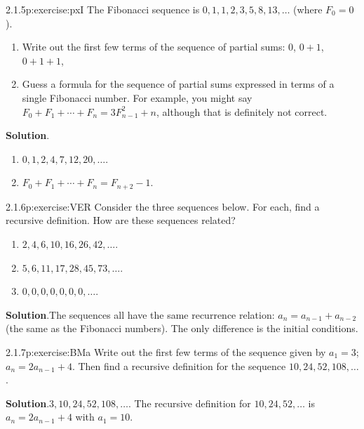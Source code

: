 \documentclass[twoside,11pt,]{book}
\newcommand{\blocktitlefont}{\relax}
\numberwithin{equation}{chapter}
\begin{document}
\begin{divisionsolution}{2.1.5}{}{p:exercise:pxI}%
\label{g:notation:idp140965978208}%
The Fibonacci sequence is \(0, 1, 1, 2, 3, 5, 8, 13, \ldots\) (where \(F_0 = 0\)). %
\begin{enumerate}[label=(\alph*)]
\item{}Write out the first few terms of the sequence of partial sums: \(0\), \(0+1\), \(0+1+1\),\textellipsis{}%
\item{}Guess a formula for the sequence of partial sums expressed in terms of a single Fibonacci number.  For example, you might say \(F_0 + F_1 + \cdots + F_n = 3F_{n-1}^2 + n\), although that is definitely not correct.%
\end{enumerate}
%
\par\smallskip%
\noindent\textbf{\blocktitlefont Solution}.\quad{}%
\begin{enumerate}[label=(\alph*)]
\item{}\(0, 1, 2, 4, 7, 12, 20, \ldots\).%
\item{}\(F_0 + F_1 + \cdots + F_n = F_{n+2} - 1\).%
\end{enumerate}
%
\end{divisionsolution}%
\begin{divisionsolution}{2.1.6}{}{p:exercise:VER}%
Consider the three sequences below. For each, find a recursive definition. How are these sequences related?%
\begin{enumerate}[label=(\alph*)]
\item{}\(2, 4, 6, 10, 16, 26, 42, \ldots\).%
\item{}\(5, 6, 11, 17, 28, 45, 73, \ldots\).%
\item{}\(0, 0 , 0 , 0 , 0 , 0 , 0 ,\ldots\).%
\end{enumerate}
%
\par\smallskip%
\noindent\textbf{\blocktitlefont Solution}.\quad{}The sequences all have the same recurrence relation: \(a_n = a_{n-1} + a_{n-2}\) (the same as the Fibonacci numbers). The only difference is the initial conditions.%
\end{divisionsolution}%
\begin{divisionsolution}{2.1.7}{}{p:exercise:BMa}%
Write out the first few terms of the sequence given by \(a_1 = 3\); \(a_n = 2a_{n-1} + 4\). Then find a recursive definition for the sequence \(10, 24, 52, 108, \ldots\).%
\par\smallskip%
\noindent\textbf{\blocktitlefont Solution}.\quad{}\(3, 10, 24, 52, 108,\ldots\). The recursive definition for \(10, 24, 52, \ldots\) is \(a_n = 2a_{n-1} + 4\) with \(a_1 = 10\).%
\end{divisionsolution}%
\end{document}
